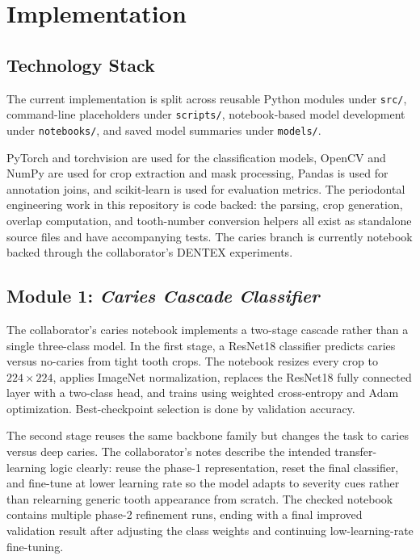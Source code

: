 
\chapter{Implementation}
\label{ch:implementation}

\section{Technology Stack}
\label{sec:impl-stack}

The current implementation is split across reusable Python modules under
\texttt{src/}, command-line placeholders under \texttt{scripts/},
notebook-based model development under \texttt{notebooks/}, and saved model
summaries under \texttt{models/}.

PyTorch and torchvision are used for the classification models, OpenCV and
NumPy are used for crop extraction and mask processing, Pandas is used for
annotation joins, and scikit-learn is used for evaluation metrics. The
periodontal engineering work in this repository is code backed: the parsing,
crop generation, overlap computation, and tooth-number conversion helpers all
exist as standalone source files and have accompanying tests. The caries branch
is currently notebook backed through the collaborator's DENTEX experiments.

\section{Module 1: \textit{Caries Cascade Classifier}}
\label{sec:impl-module1}

The collaborator's caries notebook implements a two-stage cascade rather than a
single three-class model. In the first stage, a ResNet18 classifier predicts
caries versus no-caries from tight tooth crops. The notebook resizes every crop
to \(224 \times 224\), applies ImageNet normalization, replaces the ResNet18
fully connected layer with a two-class head, and trains using weighted
cross-entropy and Adam optimization. Best-checkpoint selection is done by
validation accuracy.

The second stage reuses the same backbone family but changes the task to
caries versus deep caries. The collaborator's notes describe the intended
transfer-learning logic clearly: reuse the phase-1 representation, reset the
final classifier, and fine-tune at lower learning rate so the model adapts to
severity cues rather than relearning generic tooth appearance from scratch. The
checked notebook contains multiple phase-2 refinement runs, ending with a final
improved validation result after adjusting the class weights and continuing
low-learning-rate fine-tuning.

